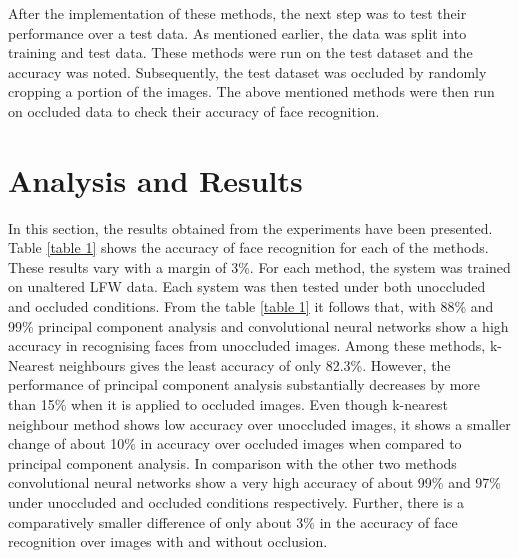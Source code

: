 \documentclass[conference]{IEEEtran}
\begin{document}
After the implementation of these methods, the next step was to test their performance over a test data. As mentioned earlier, the data was split into training and test data. These methods were run on the test dataset and the accuracy was noted. Subsequently, the test dataset was occluded by randomly cropping a portion of the images. The above mentioned methods were then run on occluded data to check their accuracy of face recognition.

\section{Analysis and Results}
\label{sec: 5. Results and Analysis}
In this section, the results obtained from the experiments have been presented. Table \ref{table 1} shows the accuracy of face recognition for each of the methods. These results vary with a margin of 3\%. For each method, the system was trained on unaltered LFW data. Each system was then tested under both unoccluded and occluded conditions. From the table \ref{table 1} it follows that, with 88\% and 99\% principal component analysis and convolutional neural networks show a high accuracy in recognising faces from unoccluded images. Among these methods, k-Nearest neighbours gives the least accuracy of only 82.3\%. However, the performance of principal component analysis substantially decreases by more than 15\% when it is applied to occluded images. Even though k-nearest neighbour method shows low accuracy over unoccluded images, it shows a smaller change of about 10\% in accuracy over occluded images when compared to principal component analysis. In comparison with the other two methods convolutional neural networks show a very high accuracy of about 99\% and 97\% under unoccluded and occluded conditions respectively. Further, there is a comparatively smaller difference of only about 3\% in the accuracy of face recognition over images with and without occlusion.
\end{document}
